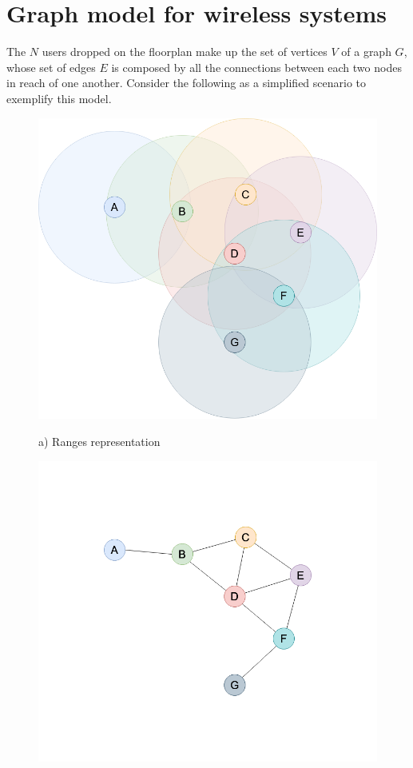 \section{Graph model for wireless systems}
The $N$ users dropped on the floorplan make up the set of vertices $V$ of a
graph $G$, whose set of edges $E$ is composed by all the connections between
each two nodes in reach of one another. Consider the following as a simplified
scenario to exemplify this model.
\begin{figure}[H]
	\begin{minipage}{.5\textwidth}
        \includegraphics[scale=.23]{img/wireless_graph_1.png}
        \begin{center}
            a) Ranges representation
        \end{center}
	\end{minipage}
	\begin{minipage}{.5\textwidth} 
		\includegraphics[scale=.23]{img/wireless_graph_2.png}

\end{minipage}
\end{figure}
